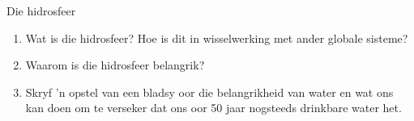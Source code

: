 \begin{eocexercises}{Die hidrosfeer}
            \nopagebreak

\begin{enumerate}[noitemsep, label=\textbf{\arabic*}. ] 
    \item Wat is die hidrosfeer? Hoe is dit in wisselwerking met ander globale sisteme?
    \item Waarom is die hidrosfeer belangrik?
    \item Skryf   'n opstel van een bladsy oor die belangrikheid van water en wat ons kan doen om te verseker dat ons oor 50 jaar nogsteeds drinkbare water het.
\end{enumerate}

\end{eocexercises}
